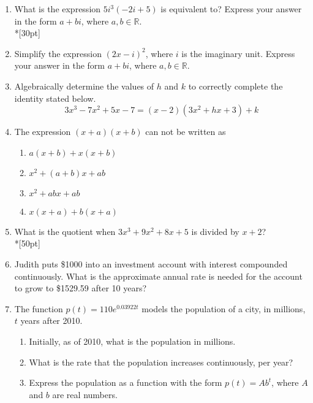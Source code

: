 \documentclass[12pt, oneside]{article}
\begin{document}
\begin{enumerate}
\item What is the expression $5i^3(-2i+5)$ is equivalent to? Express your answer in the form $a+bi$, where $a, b \in \mathbb{R}$.\\*[30pt]  %

\item Simplify the expression $(2x - i)^2$, where $i$ is the imaginary unit. Express your answer in the form $a+bi$, where $a, b \in \mathbb{R}$.\\[30pt] %

\item Algebraically determine the values of $h$ and $k$ to correctly complete the identity stated below.
\[3x^3-7x^2+5x-7=(x-2)(3x^2+hx+3)+k\] %

\newpage
\item The expression $(x + a)(x + b)$ can not be written as
\begin{enumerate}
    \item $a(x + b)+ x(x + b)$
    \item $x^2 + (a + b)x + ab$ 
    \item  $x^2 + abx + ab$  
    \item $x(x + a)+ b(x + a)$
\end{enumerate}

\item What is the quotient when $3x^3+9x^2+8x+5$ is divided by $x+2$?\\*[50pt]

\newpage
\item Judith puts \$1000 into an investment account with interest compounded continuously. What is the approximate annual rate is needed for the account to grow to \$1529.59 after 10 years?

\item The function $p(t)=110e^{0.03922t}$ models the population of a city, in millions, $t$ years after 2010.
\begin{enumerate}
    \item Initially, as of 2010, what is the population in millions.\\[40pt]
    \item What is the rate that the population increases continuously, per year?\\[40pt]
    \item Express the population as a function with the form $p(t)=Ab^{t}$, where $A$ and $b$ are real numbers.\\[40pt]
\end{enumerate}


\end{enumerate}
\end{document}
